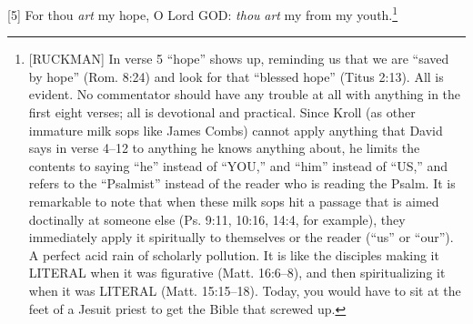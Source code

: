 [5] \textcolor[rgb]{0.00,0.00,1.00}{For thou \emph{art} my hope, O Lord GOD: \emph{thou} \emph{art} my  from my youth.}\footnote{[RUCKMAN] In verse 5 “hope” shows up, reminding us that we are “saved by hope” (Rom. 8:24) and look for that “blessed hope” (Titus 2:13). All is evident. No commentator should have any trouble at all with anything in the first eight verses; all is devotional and practical. Since Kroll (as other immature milk sops like James Combs) cannot apply anything that David says in verse 4–12 to anything he knows anything about, he limits the contents to saying “he” instead of “YOU,” and “him” instead of “US,” and refers to the “Psalmist” instead of the reader who is reading the Psalm. It is remarkable to note that when these milk sops hit a passage that is aimed doctinally at someone else (Ps. 9:11, 10:16, 14:4, for example), they immediately apply it spiritually to themselves or the reader (“us” or “our”). A perfect acid rain of scholarly pollution. It is like the disciples making it LITERAL when it was figurative (Matt. 16:6–8), and then spiritualizing it when it was LITERAL (Matt. 15:15–18). Today, you would have to sit at the feet of a Jesuit priest to get the Bible that screwed up.\cite{Ruckman1992Psalms}} 
